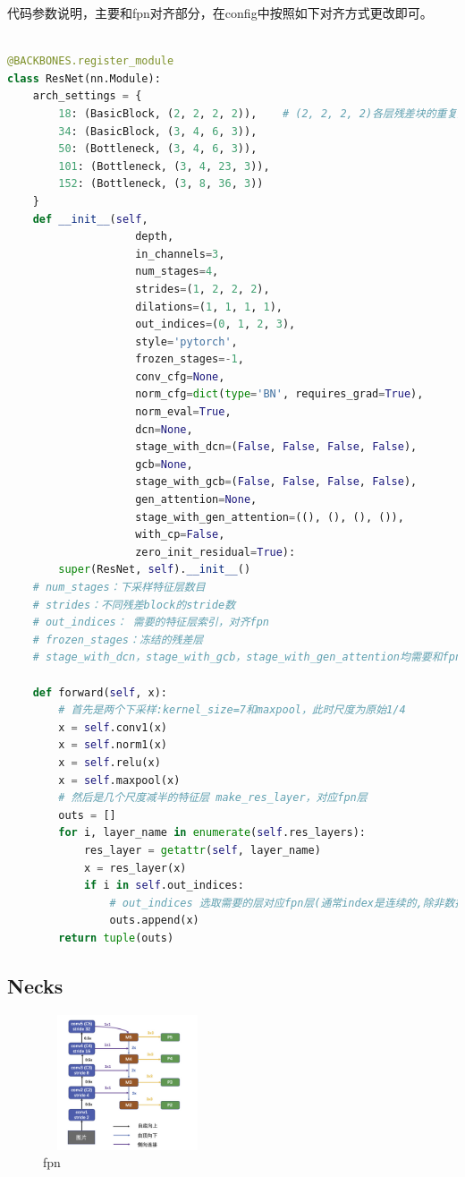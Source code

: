 \documentclass[UTF8]{ctexart}
\begin{document}
代码参数说明，主要和fpn对齐部分，在config中按照如下对齐方式更改即可。
\lstset{style=mystyle}
\begin{lstlisting}[language=Python]

@BACKBONES.register_module
class ResNet(nn.Module):
	arch_settings = {
		18: (BasicBlock, (2, 2, 2, 2)),    # (2, 2, 2, 2)各层残差块的重复数目
		34: (BasicBlock, (3, 4, 6, 3)),
		50: (Bottleneck, (3, 4, 6, 3)),
		101: (Bottleneck, (3, 4, 23, 3)),
		152: (Bottleneck, (3, 8, 36, 3))
	}
	def __init__(self,
					depth,
					in_channels=3,
					num_stages=4,
					strides=(1, 2, 2, 2),
					dilations=(1, 1, 1, 1),
					out_indices=(0, 1, 2, 3),
					style='pytorch',
					frozen_stages=-1,
					conv_cfg=None,
					norm_cfg=dict(type='BN', requires_grad=True),
					norm_eval=True,
					dcn=None,
					stage_with_dcn=(False, False, False, False),
					gcb=None,
					stage_with_gcb=(False, False, False, False),
					gen_attention=None,
					stage_with_gen_attention=((), (), (), ()),
					with_cp=False,
					zero_init_residual=True):
		super(ResNet, self).__init__()
	# num_stages：下采样特征层数目
	# strides：不同残差block的stride数
	# out_indices： 需要的特征层索引，对齐fpn
	# frozen_stages：冻结的残差层
	# stage_with_dcn，stage_with_gcb，stage_with_gen_attention均需要和fpn层对齐

	def forward(self, x):
		# 首先是两个下采样:kernel_size=7和maxpool，此时尺度为原始1/4
		x = self.conv1(x)
		x = self.norm1(x)
		x = self.relu(x)
		x = self.maxpool(x)
		# 然后是几个尺度减半的特征层 make_res_layer，对应fpn层
		outs = []
		for i, layer_name in enumerate(self.res_layers):
			res_layer = getattr(self, layer_name)
			x = res_layer(x)
			if i in self.out_indices:
				# out_indices 选取需要的层对应fpn层(通常index是连续的,除非数据特殊，刚好都只有一大一小物体)
				outs.append(x)
		return tuple(outs)
\end{lstlisting}


\subsection{Necks}
\begin{figure}[htbp]
	\centering
	\includegraphics[width=5cm,height=4cm]{./pic/fpn.png}
	\caption{fpn}
	\label{picfpn}
\end{figure}
\end{document}
